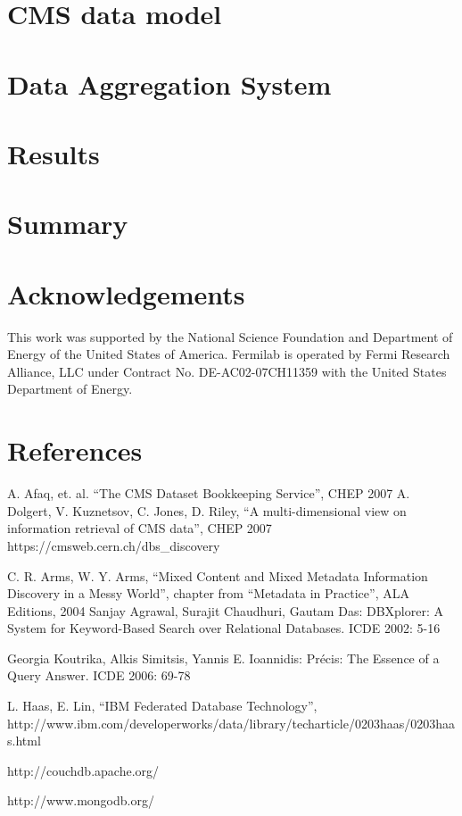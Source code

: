 \documentclass[a4paper]{jpconf}
\begin{document}
\section{CMS data model\label{DataModel}}
\section{Data Aggregation System\label{DAS}}
\section{Results\label{Results}}



\section{Summary}

\section{Acknowledgements}

This work was supported by the National Science Foundation and Department of Energy of the United States of America. Fermilab is operated by Fermi Research Alliance, LLC under Contract
No. DE-AC02-07CH11359 with the United States Department of Energy.

\section*{References}
\begin{thebibliography}{9}
 A. Afaq, et. al. ``The CMS Dataset Bookkeeping Service'', CHEP 2007 
 A. Dolgert, V. Kuznetsov, C. Jones, D. Riley, 
``A multi-dimensional view on information retrieval of CMS data'', CHEP 2007
 https://cmsweb.cern.ch/dbs\_discovery

C. R. Arms, W. Y. Arms, ``Mixed Content and Mixed Metadata 
Information Discovery in a Messy World'',
chapter from ``Metadata in Practice'', ALA Editions, 2004
Sanjay Agrawal, Surajit Chaudhuri, Gautam Das: DBXplorer: A System for
Keyword-Based Search over Relational Databases. ICDE 2002: 5-16

Georgia Koutrika, Alkis Simitsis, Yannis E. Ioannidis: Pr\'{e}cis: The Essence of
a Query Answer. ICDE 2006: 69-78

L. Haas, E. Lin,
``IBM Federated Database Technology'', \\
http://www.ibm.com/developerworks/data/library/techarticle/0203haas/0203haas.html

http://couchdb.apache.org/

http://www.mongodb.org/

\end{thebibliography}
\end{document}
